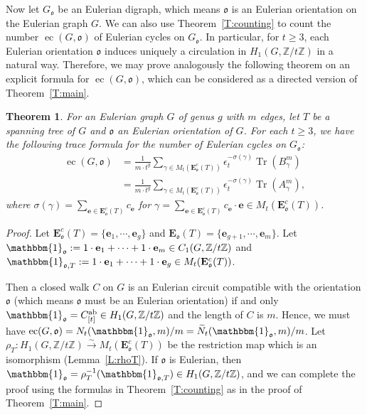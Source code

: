 \documentclass[11pt]{amsart}
\theoremstyle{plain}
\newtheorem{theorem}{Theorem}[section]
\theoremstyle{definition}
\newcommand{\mbbZ}{{\mathbb Z}}
\newcommand{\mfrako}{{\mathfrak o}}
\newcommand{\ve}{{\mathbf e}}
\newcommand{\vE}{{\mathbf E}}
\DeclareMathOperator{\ab}{\operatorname{ab}}
\DeclareMathOperator{\ec}{\operatorname{ec}}
\DeclareMathOperator{\trace}{\operatorname{Tr}}
\numberwithin{equation}{section}
\begin{document}
Now let $G_\mfrako$ be an Eulerian digraph, which means $\mfrako$ is an Eulerian orientation on the Eulerian graph $G$. We can also use Theorem~\ref{T:counting} to count the number $\ec(G,\mfrako)$ of Eulerian cycles on $G_\mfrako$.  In particular, for $t\geq 3$, each Eulerian orientation $\mfrako$ induces uniquely a circulation in $H_1(G,\mbbZ/t\mbbZ)$ in a natural way. Therefore, we may prove analogously the following theorem on an explicit formula for $\ec(G,\mfrako)$, which can be considered as a directed version of Theorem~\ref{T:main}. 


\begin{theorem} \label{T:directed_eulerian}
For an Eulerian graph $G$ of genus $g$ with $m$ edges, let $T$ be a spanning tree of $G$ and $\mfrako$ an Eulerian orientation of $G$.  For each $t\geq 3$, we have the following trace formula for the number of Eulerian cycles on $G_\mfrako$:
\begin{align*}
\ec(G,\mfrako) &= \frac{1}{m\cdot t^g}\sum_{\gamma\in M_t(\vE_\mfrako^c(T))}\epsilon_t^{-\sigma(\gamma)}\trace\left(B_\gamma^m\right) \\
&= \frac{1}{m\cdot t^g}\sum_{\gamma\in M_t(\vE_\mfrako^c(T))}\epsilon_t^{-\sigma(\gamma)}\trace\left(A_\gamma^m\right),
\end{align*}
where $\sigma(\gamma)=\sum_{\ve\in \vE_\mfrako^c(T)} c_\ve$ for $\gamma = \sum_{\ve\in \vE_\mfrako^c(T)}c_\ve \cdot \ve \in M_t(\vE_\mfrako^c(T) )$. 
\end{theorem}
\begin{proof}
Let $\vE_\mfrako^c(T)=\{\ve_1,\cdots,\ve_g\}$ and $\vE_\mfrako(T)=\{\ve_{g+1},\cdots,\ve_m\}$. Let $\mathbbm{1}_\mfrako:= 1\cdot \ve_1+\cdots+1\cdot \ve_m \in C_1(G,\mbbZ/t\mbbZ)$ and $\mathbbm{1}_{\mfrako,T}:= 1\cdot \ve_1+\cdots+1\cdot \ve_g \in M_t(\vE_\mfrako^c(T))$. 

Then a closed walk $C$ on $G$ is an Eulerian circuit compatible with the orientation $\mfrako$ (which means $\mfrako$ must be an Eulerian orientation) if and only $\mathbbm{1}_\mfrako=C^{\ab}_{[t]}\in H_1(G,\mbbZ/t\mbbZ)$ and the length of $C$ is $m$. Hence, we must have $\ec(G,\mfrako)=N_t(\mathbbm{1}_\mfrako,m) /m= \widetilde{N}_t(\mathbbm{1}_\mfrako,m)/m$.  Let $\rho_T:H_1(G,\mbbZ/t\mbbZ) \xrightarrow{\sim} M_t(\vE_\mfrako^c(T)) $ be the restriction map which is an isomorphism (Lemma~\ref{L:rhoT}). If $\mfrako$ is Eulerian, then $\mathbbm{1}_\mfrako=\rho_T^{-1}(\mathbbm{1}_{\mfrako,T})\in H_1(G,\mbbZ/t\mbbZ)$, and we can complete the proof using the formulas in Theorem~\ref{T:counting} as in the proof of Theorem~\ref{T:main}. 
\end{proof}
\end{document}
